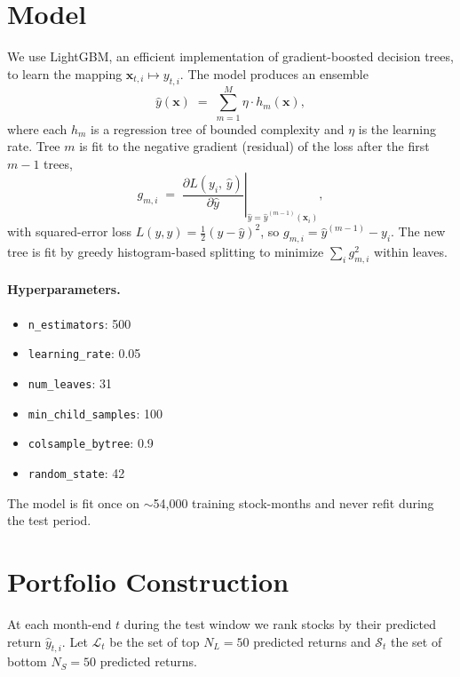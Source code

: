 \documentclass[11pt]{article}
\begin{document}
\section{Model}
\label{sec:model}
We use LightGBM, an efficient implementation of gradient-boosted decision trees, to learn
the mapping $\mathbf{x}_{t,i} \mapsto y_{t,i}$. The model produces an ensemble
\begin{equation}
\hat{y}(\mathbf{x}) \;=\; \sum_{m=1}^{M} \eta \cdot h_m(\mathbf{x}),
\end{equation}
where each $h_m$ is a regression tree of bounded complexity and $\eta$ is the learning
rate. Tree $m$ is fit to the negative gradient (residual) of the loss after the first
$m-1$ trees,
\begin{equation}
g_{m,i} \;=\; \left.\frac{\partial L(y_i,\,\hat{y})}{\partial \hat{y}}\right|_{\hat{y}=\hat{y}^{(m-1)}(\mathbf{x}_i)},
\end{equation}
with squared-error loss $L(y,\hat{y}) = \tfrac{1}{2}(y-\hat{y})^2$, so $g_{m,i} = \hat{y}^{(m-1)} - y_i$.
The new tree is fit by greedy histogram-based splitting to minimize $\sum_i g_{m,i}^2$ within leaves.

\paragraph{Hyperparameters.}
\begin{itemize}[leftmargin=*, itemsep=2pt]
    \item \texttt{n\_estimators}: 500
    \item \texttt{learning\_rate}: 0.05
    \item \texttt{num\_leaves}: 31
    \item \texttt{min\_child\_samples}: 100
    \item \texttt{colsample\_bytree}: 0.9
    \item \texttt{random\_state}: 42
\end{itemize}
The model is fit once on $\sim$54,000 training stock-months and never refit during the
test period.

\section{Portfolio Construction}
\label{sec:portfolio}
At each month-end $t$ during the test window we rank stocks by their predicted return
$\hat{y}_{t,i}$. Let $\mathcal{L}_t$ be the set of top $N_L = 50$ predicted returns and
$\mathcal{S}_t$ the set of bottom $N_S = 50$ predicted returns.
\end{document}

